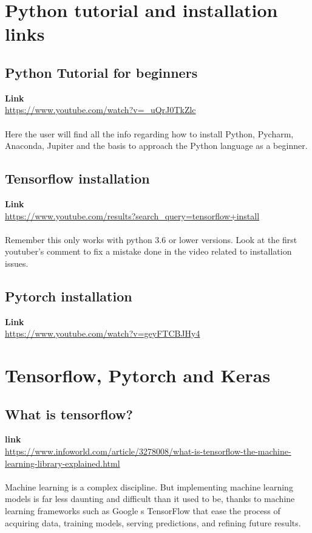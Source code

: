 \documentclass[11pt]{article}
\begin{document}
\clearpage
\section{Python tutorial and installation links}
\subsection{Python Tutorial for beginners}
\textbf{Link}\\
\url{https://www.youtube.com/watch?v=_uQrJ0TkZlc}\\\\
Here the user will find all the info regarding how to install Python, Pycharm, Anaconda, Jupiter and the basis to approach the Python language as a beginner.



\subsection{Tensorflow installation}
\textbf{Link}\\
\url{https://www.youtube.com/results?search_query=tensorflow+install}\\\\
Remember this only works with python 3.6 or lower versions.
Look at the first youtuber's comment  to fix a mistake done 
in the video related to installation issues. 


\subsection{Pytorch installation}
\textbf{Link} \\
\url{https://www.youtube.com/watch?v=geyFTCBJHy4}

\clearpage
\section{Tensorflow, Pytorch and Keras}
\subsection{What is tensorflow?}
\textbf{link}\\
\url{https://www.infoworld.com/article/3278008/what-is-tensorflow-the-machine-learning-library-explained.html}\\\\
Machine learning is a complex discipline. But implementing machine learning models is far less daunting and difficult than it used to be, thanks to machine learning frameworks such as Google \textquotesingle s TensorFlow that ease the process of acquiring data, training models, serving predictions, and refining future results.
\end{document}
